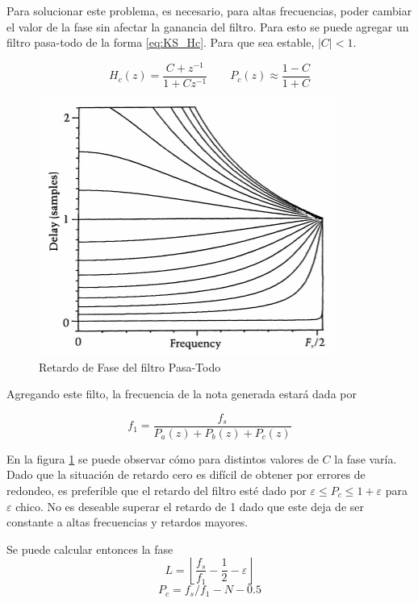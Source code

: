 Para solucionar este problema, es necesario, para altas frecuencias, poder cambiar el valor de la fase sin afectar la ganancia del filtro. Para esto se puede agregar un filtro pasa-todo de la forma \eqref{eq:KS_Hc}. Para que sea estable, $|C|<1$.

\begin{equation}
    H_c(z) = \frac{C + z^{-1}}{1+Cz^{-1}}\qquad P_c(z)\approx \frac{1-C}{1+C}
    \label{eq:KS_Hc}
\end{equation}

\begin{figure}[ht]
    \centering
    \includegraphics{res/allpass_phase.jpg}
    \caption{Retardo de Fase del filtro Pasa-Todo}
    \label{fig:KS_AllPass}
\end{figure}

Agregando este filto, la frecuencia de la nota generada estará dada por

\begin{equation*}
    f_1 = \frac{f_s}{P_a(z) + P_b(z) + P_c(z)}
\end{equation*}

En la figura \ref{fig:KS_AllPass} se puede observar cómo para distintos valores de $C$ la fase varía. Dado que la situación de retardo cero es difícil de obtener por errores de redondeo, es preferible que el retardo del filtro esté dado por $\varepsilon \leq P_c \leq 1+ \varepsilon$ para $\varepsilon$ chico. No es deseable superar el retardo de 1 dado que este deja de ser constante a altas frecuencias y retardos mayores.

Se puede calcular entonces la fase
\begin{equation*}
    L = \left\lfloor \frac{f_s}{f_1} - \frac{1}{2} - \varepsilon \right\rfloor
\end{equation*}
\begin{equation*}
    P_c = f_s/f_1 - N - 0.5
\end{equation*}

